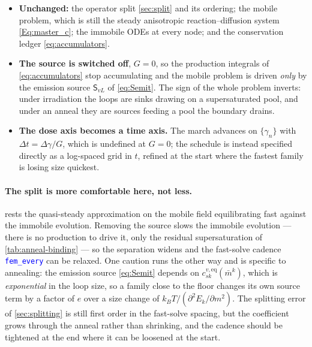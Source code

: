 \documentclass{article}
\newcommand{\textttclr}[1]{\textcolor{blue}{\texttt{#1}}}
\newcommand{\spvec}[1]{\bm{\mathsf{#1}}}   %
\begin{document}
\begin{itemize}
\item \textbf{Unchanged:} the operator split \cref{sec:split} and its ordering;
      the mobile problem, which is still the steady anisotropic
      reaction--diffusion system \cref{Eq:master_c}; the immobile ODEs at every
      node; and the conservation ledger \cref{eq:accumulators}.
\item \textbf{The source is switched off}, $G=0$, so the production integrals of
      \cref{eq:accumulators} stop accumulating and the mobile problem is driven
      \emph{only} by the emission source $\spvec S_{vL}$ of \cref{eq:Semit}. The
      sign of the whole problem inverts: under irradiation the loops are sinks
      drawing on a supersaturated pool, and under an anneal they are sources
      feeding a pool the boundary drains.
\item \textbf{The dose axis becomes a time axis.} The march advances on
      $\{\gamma_n\}$ with $\Delta t=\Delta\gamma/G$, which is undefined at $G=0$;
      the schedule is instead specified directly as a log-spaced grid in $t$,
      refined at the start where the fastest family is losing size quickest.
\end{itemize}

\paragraph{The split is more comfortable here, not less.}  rests
the quasi-steady approximation on the mobile field equilibrating fast against the
immobile evolution. Removing the source slows the immobile evolution --- there is
no production to drive it, only the residual supersaturation of
\cref{tab:anneal-binding} --- so the separation widens and the fast-solve cadence
\textttclr{fem\_every} can be relaxed. One caution runs the other way and is
specific to annealing: the emission source \cref{eq:Semit} depends on
$c^{v,\mathrm{eq}}_{sk}(\bar m^k)$, which is \emph{exponential} in the loop size,
so a family close to the floor changes its own source term by a factor of $e$ over
a size change of $k_BT/(\partial^2E_k/\partial m^2)$. The splitting error of
\cref{sec:splitting} is still first order in the fast-solve spacing, but the
coefficient grows through the anneal rather than shrinking, and the cadence should
be tightened at the end where it can be loosened at the start.
\end{document}
